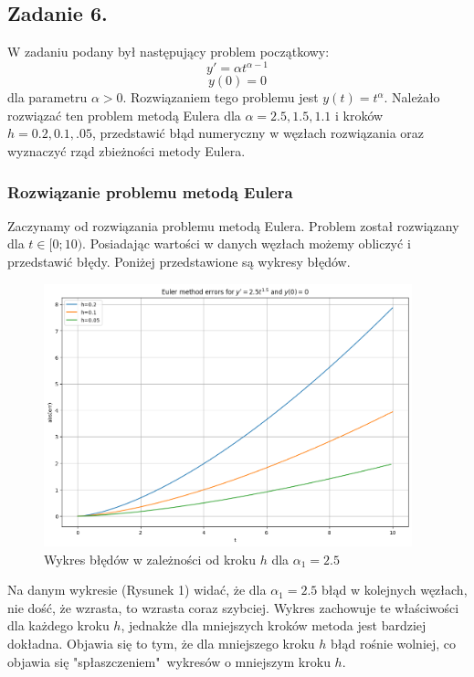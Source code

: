 \documentclass{article}
\begin{document}
\subsection{Zadanie 6.}
W zadaniu podany był następujący problem początkowy:
$$y' = \alpha t^{\alpha-1}$$
$$y(0) = 0$$
dla parametru $\alpha > 0$. Rozwiązaniem tego problemu jest $y(t) = t^{\alpha}$. Należało rozwiązać ten problem metodą Eulera dla $\alpha = 2.5, 1.5, 1.1$ i kroków $h = 0.2, 0.1, .05$, przedstawić błąd numeryczny w węzłach rozwiązania oraz wyznaczyć rząd zbieżności metody Eulera.

\subsubsection{Rozwiązanie problemu metodą Eulera}
Zaczynamy od rozwiązania problemu metodą Eulera. Problem został rozwiązany dla $t \in [0; 10)$. Posiadając wartości w danych węzłach możemy obliczyć i przedstawić błędy. Poniżej przedstawione są wykresy błędów.
\begin{figure}[H]
    \centering
    \includegraphics[width=0.95\textwidth]{1}
    \caption{Wykres błędów w zależności od kroku $h$ dla $\alpha_1 = 2.5$}
    \label{fig:mesh}
\end{figure}
Na danym wykresie (Rysunek 1) widać, że dla $\alpha_1 = 2.5$ błąd w kolejnych węzłach, nie dość, że wzrasta, to wzrasta coraz szybciej. Wykres zachowuje te właściwości dla każdego kroku $h$, jednakże dla mniejszych kroków metoda jest bardziej dokładna. Objawia się to tym, że dla mniejszego kroku $h$ błąd rośnie wolniej, co objawia się "spłaszczeniem"\ wykresów o mniejszym kroku $h$.
\end{document}
